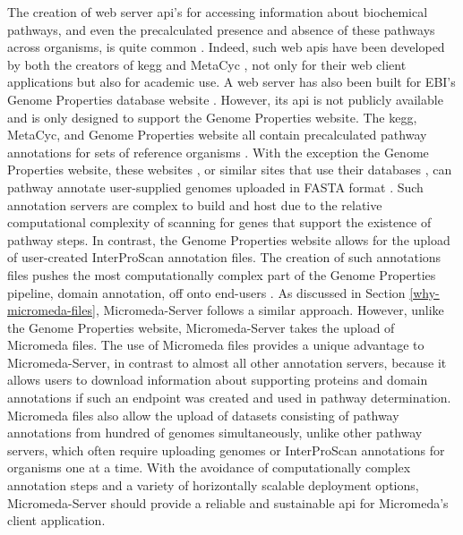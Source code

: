 The creation of web server \gls{api}'s for accessing information about biochemical pathways, and even the precalculated presence and absence of these pathways across organisms, is quite common \cite{wu2006kobas,moriya2010pathpred,pireddu2006path,vallenet2009microscope,aziz2008rast,takami2016automated,moriya2007kaas,chou2009fmm}. Indeed, such web \gls{api}s have been developed by both the creators of \gls{kegg}  \cite{kawashima2003kegg} and MetaCyc \cite{karp2013data}, not only for their web client applications but also for academic use. A web server has also been built for EBI's Genome Properties database website \cite{richardson2018genome}. However, its \gls{api} is not publicly available and is only designed to support the Genome Properties website. The \gls{kegg}, MetaCyc, and Genome Properties website all contain precalculated pathway annotations for sets of reference organisms \cite{kanehisa2000kegg,karp2002metacyc,karp2013data}. With the exception the Genome Properties website, these websites \cite{kanehisa2016blastkoala}, or similar sites that use their databases \cite{chou2009fmm,moriya2007kaas,takami2016automated}, can pathway annotate user-supplied genomes uploaded in FASTA format \cite{pearson19905}. Such annotation servers are complex to build and host due to the relative computational complexity of scanning for genes that support the existence of pathway steps. In contrast, the Genome Properties website allows for the upload of user-created InterProScan annotation files. The creation of such annotations files pushes the most computationally complex part of the Genome Properties pipeline, domain annotation, off onto end-users \cite{richardson2018genome}. As discussed in Section \ref{why-micromeda-files}, Micromeda-Server follows a similar approach. However, unlike the Genome Properties website, Micromeda-Server takes the upload of Micromeda files. The use of Micromeda files provides a unique advantage to Micromeda-Server, in contrast to almost all other annotation servers, because it allows users to download information about supporting proteins and domain annotations if such an endpoint was created and used in pathway determination. Micromeda files also allow the upload of datasets consisting of pathway annotations from hundred of genomes simultaneously, unlike other pathway servers, which often require uploading genomes or InterProScan annotations for organisms one at a time. With the avoidance of computationally complex annotation steps and a variety of horizontally scalable deployment options, Micromeda-Server should provide a reliable and sustainable \gls{api} for Micromeda's client application.

